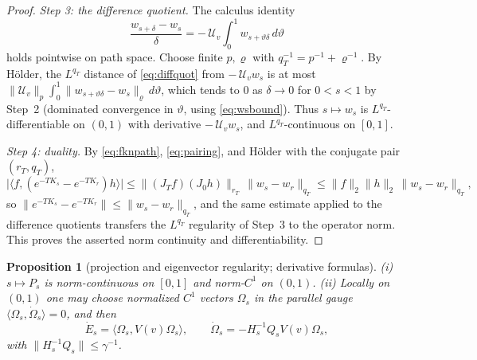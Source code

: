 \documentclass[11pt,a4paper]{article}
\theoremstyle{plain}
\newtheorem{proposition}[theorem]{Proposition}
\theoremstyle{definition}
\theoremstyle{plain}
\theoremstyle{definition}
\newcommand{\Om}{\Omega}
\newcommand{\ip}[2]{\langle #1,#2\rangle}
\begin{document}
\begin{proof}
\emph{Step 3: the difference quotient.} The calculus identity
\begin{equation}
 \frac{w_{s+\delta}-w_s}{\delta}
 =-\,\mathcal U_v\int_0^1w_{s+\vartheta\delta}\,d\vartheta
 \label{eq:diffquot}
\end{equation}
holds pointwise on path space. Choose finite $p,\varrho$ with
$q_T^{-1}=p^{-1}+\varrho^{-1}$. By H\"older, the $L^{q_T}$ distance of
\eqref{eq:diffquot} from $-\,\mathcal U_vw_s$ is at most
$\|\mathcal U_v\|_p\int_0^1\|w_{s+\vartheta\delta}-w_s\|_\varrho\,d\vartheta$, which tends
to $0$ as $\delta\to0$ for $0<s<1$ by Step~2 (dominated convergence in $\vartheta$, using
\eqref{eq:wsbound}). Thus $s\mapsto w_s$ is $L^{q_T}$-differentiable on $(0,1)$ with
derivative $-\,\mathcal U_vw_s$, and $L^{q_T}$-continuous on $[0,1]$.

\emph{Step 4: duality.} By \eqref{eq:fknpath}, \eqref{eq:pairing}, and H\"older with the
conjugate pair $(r_T,q_T)$,
\[
 \bigl|\ip{f}{(e^{-TK_s}-e^{-TK_r})h}\bigr|
 \le\|(J_Tf)(J_0h)\|_{r_T}\,\|w_s-w_r\|_{q_T}
 \le\|f\|_2\|h\|_2\,\|w_s-w_r\|_{q_T},
\]
so $\|e^{-TK_s}-e^{-TK_r}\|\le\|w_s-w_r\|_{q_T}$, and the same estimate applied to the
difference quotients transfers the $L^{q_T}$ regularity of Step~3 to the operator norm.
This proves the asserted norm continuity and differentiability.
\end{proof}

\begin{proposition}[projection and eigenvector regularity; derivative formulas]\label{prop:projreg}
\emph{(i)} $s\mapsto P_s$ is norm-continuous on $[0,1]$ and norm-$C^1$ on $(0,1)$.
\emph{(ii)} Locally on $(0,1)$ one may choose normalized $C^1$ vectors $\Om_s$ in the
parallel gauge $\ip{\Om_s}{\dot\Om_s}=0$, and then
\begin{equation}
 \dot E_s=\ip{\Om_s}{V(v)\Om_s},\qquad
 \dot\Om_s=-H_s^{-1}Q_sV(v)\Om_s ,
 \label{eq:derivform}
\end{equation}
with $\|H_s^{-1}Q_s\|\le\gamma^{-1}$.
\end{proposition}
\end{document}
